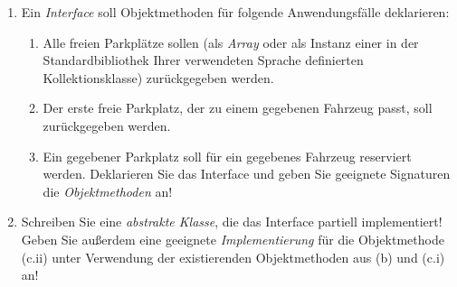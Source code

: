 \documentclass{lehramt-informatik-aufgabe}
\begin{document}
\begin{enumerate}
\begin{liAntwort}
\end{liAntwort}


\item Ein \emph{Interface}  soll Objektmethoden für
folgende Anwendungsfälle deklarieren:

\begin{enumerate}


\item Alle freien Parkplätze sollen (\zB als \emph{Array} oder als
Instanz einer in der Standardbibliothek Ihrer verwendeten Sprache
definierten Kollektionsklasse) zurückgegeben werden.


\item Der erste freie Parkplatz, der zu einem gegebenen Fahrzeug passt,
soll zurückgegeben werden.


\item Ein gegebener Parkplatz soll für ein gegebenes Fahrzeug reserviert
werden. Deklarieren Sie das Interface und geben Sie geeignete Signaturen
die \emph{Objektmethoden} an!
\end{enumerate}

\begin{liAntwort}
\end{liAntwort}

\item Schreiben Sie eine \emph{abstrakte Klasse}, die das Interface
 partiell implementiert! Geben Sie außerdem eine
geeignete \emph{Implementierung} für die Objektmethode (c.ii) unter
Verwendung der existierenden Objektmethoden aus (b) und (c.i) an!

\begin{liAntwort}
\end{liAntwort}

\end{enumerate}
\end{document}
